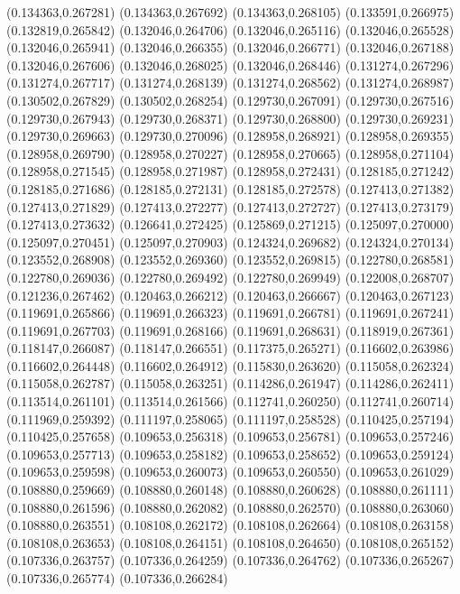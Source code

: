 (0.134363,0.267281)
(0.134363,0.267692)
(0.134363,0.268105)
(0.133591,0.266975)
(0.132819,0.265842)
(0.132046,0.264706)
(0.132046,0.265116)
(0.132046,0.265528)
(0.132046,0.265941)
(0.132046,0.266355)
(0.132046,0.266771)
(0.132046,0.267188)
(0.132046,0.267606)
(0.132046,0.268025)
(0.132046,0.268446)
(0.131274,0.267296)
(0.131274,0.267717)
(0.131274,0.268139)
(0.131274,0.268562)
(0.131274,0.268987)
(0.130502,0.267829)
(0.130502,0.268254)
(0.129730,0.267091)
(0.129730,0.267516)
(0.129730,0.267943)
(0.129730,0.268371)
(0.129730,0.268800)
(0.129730,0.269231)
(0.129730,0.269663)
(0.129730,0.270096)
(0.128958,0.268921)
(0.128958,0.269355)
(0.128958,0.269790)
(0.128958,0.270227)
(0.128958,0.270665)
(0.128958,0.271104)
(0.128958,0.271545)
(0.128958,0.271987)
(0.128958,0.272431)
(0.128185,0.271242)
(0.128185,0.271686)
(0.128185,0.272131)
(0.128185,0.272578)
(0.127413,0.271382)
(0.127413,0.271829)
(0.127413,0.272277)
(0.127413,0.272727)
(0.127413,0.273179)
(0.127413,0.273632)
(0.126641,0.272425)
(0.125869,0.271215)
(0.125097,0.270000)
(0.125097,0.270451)
(0.125097,0.270903)
(0.124324,0.269682)
(0.124324,0.270134)
(0.123552,0.268908)
(0.123552,0.269360)
(0.123552,0.269815)
(0.122780,0.268581)
(0.122780,0.269036)
(0.122780,0.269492)
(0.122780,0.269949)
(0.122008,0.268707)
(0.121236,0.267462)
(0.120463,0.266212)
(0.120463,0.266667)
(0.120463,0.267123)
(0.119691,0.265866)
(0.119691,0.266323)
(0.119691,0.266781)
(0.119691,0.267241)
(0.119691,0.267703)
(0.119691,0.268166)
(0.119691,0.268631)
(0.118919,0.267361)
(0.118147,0.266087)
(0.118147,0.266551)
(0.117375,0.265271)
(0.116602,0.263986)
(0.116602,0.264448)
(0.116602,0.264912)
(0.115830,0.263620)
(0.115058,0.262324)
(0.115058,0.262787)
(0.115058,0.263251)
(0.114286,0.261947)
(0.114286,0.262411)
(0.113514,0.261101)
(0.113514,0.261566)
(0.112741,0.260250)
(0.112741,0.260714)
(0.111969,0.259392)
(0.111197,0.258065)
(0.111197,0.258528)
(0.110425,0.257194)
(0.110425,0.257658)
(0.109653,0.256318)
(0.109653,0.256781)
(0.109653,0.257246)
(0.109653,0.257713)
(0.109653,0.258182)
(0.109653,0.258652)
(0.109653,0.259124)
(0.109653,0.259598)
(0.109653,0.260073)
(0.109653,0.260550)
(0.109653,0.261029)
(0.108880,0.259669)
(0.108880,0.260148)
(0.108880,0.260628)
(0.108880,0.261111)
(0.108880,0.261596)
(0.108880,0.262082)
(0.108880,0.262570)
(0.108880,0.263060)
(0.108880,0.263551)
(0.108108,0.262172)
(0.108108,0.262664)
(0.108108,0.263158)
(0.108108,0.263653)
(0.108108,0.264151)
(0.108108,0.264650)
(0.108108,0.265152)
(0.107336,0.263757)
(0.107336,0.264259)
(0.107336,0.264762)
(0.107336,0.265267)
(0.107336,0.265774)
(0.107336,0.266284)
